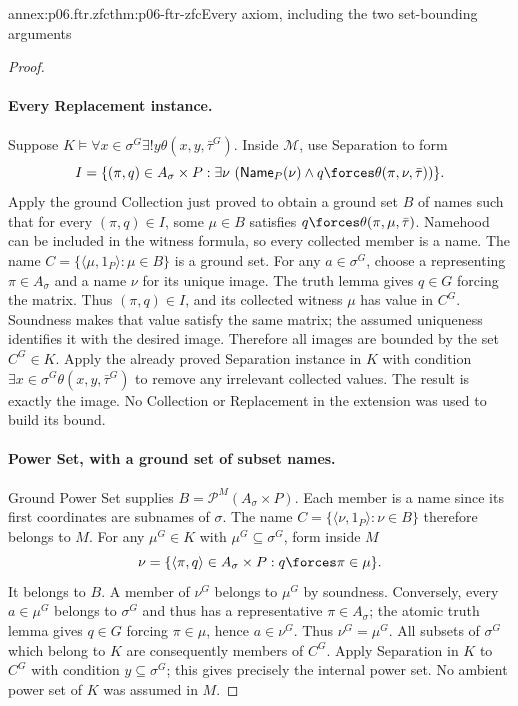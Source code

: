 \begin{annexitem}{annex:p06.ftr.zfc}{thm:p06-ftr-zfc}{Every axiom, including the two set-bounding arguments}
\begin{proof}
\paragraph{Every Replacement instance.}
Suppose \(K\models\forall x\in\sigma^G\exists!y\theta(x,y,\bar\tau^G)\).
Inside \(\mathcal M\), use Separation to form
\[
 I=\{(\pi,q)\in A_\sigma\times P:
          \exists\nu\ (\mathsf{Name}_P(\nu)\land
                            q\forces\theta(\pi,\nu,\bar\tau))\}.
\]
Apply the ground Collection just proved to obtain a ground set \(B\) of
names such that for every \((\pi,q)\in I\), some \(\mu\in B\)
satisfies \(q\forces\theta(\pi,\mu,\bar\tau)\). Namehood can be
included in the witness formula, so every collected member is a name.
The name \(C=\{\langle\mu,1_P\rangle:\mu\in B\}\) is a ground set.
For any \(a\in\sigma^G\), choose a representing \(\pi\in A_\sigma\)
and a name \(\nu\) for its unique image. The truth lemma gives
\(q\in G\) forcing the matrix. Thus \((\pi,q)\in I\), and its
collected witness \(\mu\) has value in \(C^G\). Soundness makes that
value satisfy the same matrix; the assumed uniqueness identifies it
with the desired image. Therefore all images are bounded by the set
\(C^G\in K\). Apply the already proved Separation instance in \(K\)
with condition \(\exists x\in\sigma^G\theta(x,y,\bar\tau^G)\) to
remove any irrelevant collected values. The result is exactly the image.
No Collection or Replacement in the extension was used to build its bound.

\paragraph{Power Set, with a ground set of subset names.}
Ground Power Set supplies \(B=\mathcal P^M(A_\sigma\times P)\).
Each member is a name since its first coordinates are subnames of
\(\sigma\). The name \(C=\{\langle\nu,1_P\rangle:\nu\in B\}\)
therefore belongs to \(M\). For any \(\mu^G\in K\) with
\(\mu^G\subseteq\sigma^G\), form inside \(M\)
\[
 \nu=\{\langle\pi,q\rangle\in A_\sigma\times P:q\forces\pi\in\mu\}.
\]
It belongs to \(B\). A member of \(\nu^G\) belongs to \(\mu^G\)
by soundness. Conversely, every \(a\in\mu^G\) belongs to \(\sigma^G\)
and thus has a representative \(\pi\in A_\sigma\); the atomic truth
lemma gives \(q\in G\) forcing \(\pi\in\mu\), hence \(a\in\nu^G\).
Thus \(\nu^G=\mu^G\). All subsets of \(\sigma^G\) which belong to
\(K\) are consequently members of \(C^G\). Apply Separation in \(K\)
to \(C^G\) with condition \(y\subseteq\sigma^G\); this gives precisely
the internal power set. No ambient power set of \(K\) was assumed in \(M\).


\end{proof}
\end{annexitem}
